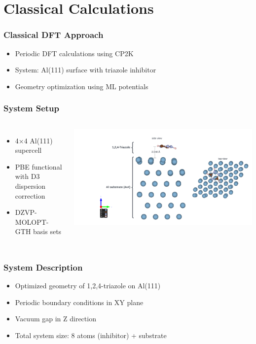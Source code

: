 \section{Classical Calculations}

\begin{frame}
\frametitle{Classical DFT Approach}
\begin{itemize}
    \item Periodic DFT calculations using CP2K
    \item System: Al(111) surface with triazole inhibitor
    \item Geometry optimization using ML potentials
\end{itemize}
\end{frame}

\begin{frame}
\frametitle{System Setup}
\begin{columns}
\begin{itemize}
    \item 4×4 Al(111) supercell
    \item PBE functional with D3 dispersion correction
    \item DZVP-MOLOPT-GTH basis sets
\end{itemize}
\includegraphics[width=\textwidth]{../../content/img/workflow_viz1.png}
\end{columns}
\end{frame}

\begin{frame}
\frametitle{System Description}
\begin{itemize}
    \item Optimized geometry of 1,2,4-triazole on Al(111)
    \item Periodic boundary conditions in XY plane
    \item Vacuum gap in Z direction
    \item Total system size: 8 atoms (inhibitor) + substrate
\end{itemize}
\end{frame} 